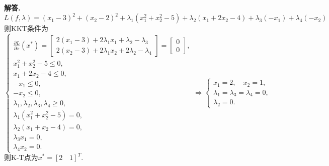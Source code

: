 \documentclass[12pt, a4paper, oneside]{ctexart}
\newenvironment{solution}{\par\noindent\textbf{解答. }}{\bigskip\par}
\let\leq=\leqslant %
\let\geq=\geqslant %
\begin{document}
\begin{solution}
    \begin{equation*}
        L(f, \lambda) = (x_1-3)^2+(x_2-2)^2+\lambda_1(x_1^2+x_2^2-5)+\lambda_2(x_1+2x_2-4)+\lambda_3(-x_1)+\lambda_4(-x_2)
    \end{equation*}
    则KKT条件为
    \begin{equation*}
        \begin{cases}
            \frac{\partial L}{\partial x}(x^*) = \left[\begin{matrix}
                2(x_1-3)+2\lambda_1x_1+\lambda_2-\lambda_3\\
                2(x_2-3)+2\lambda_1x_2+2\lambda_2-\lambda_4
            \end{matrix}\right]=\left[\begin{matrix}
                0\\0
            \end{matrix}\right],\\
            x_1^2+x_2^2-5\leq 0,\\
            x_1+2x_2-4\leq 0,\\
            -x_1\leq 0,\\
            -x_2\leq 0,\\
            \lambda_1,\lambda_2,\lambda_3,\lambda_4\geq 0,\\
            \lambda_1(x_1^2+x_2^2-5)=0,\\
            \lambda_2(x_1+x_2-4) = 0,\\
            \lambda_3x_1=0,\\
            \lambda_4x_2=0.
        \end{cases}\Rightarrow
        \begin{cases}
            x_1 = 2,\quad x_2 = 1,\\
            \lambda_1 = \lambda_3 = \lambda_4 = 0,\\
            \lambda_2 = 0.
        \end{cases}
    \end{equation*}
    则K-T点为$x^* = [2\quad 1]^T$.
\end{solution}
\end{document}
